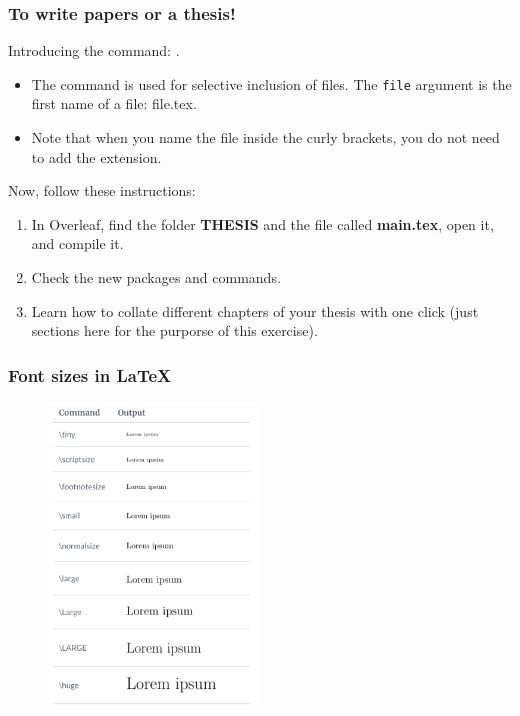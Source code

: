 \begin{frame}[fragile]
\frametitle{To write papers or a thesis!}
Introducing the command: \color{blue}{\verb||}\color{black}{}. \\
\begin{itemize}
\item The \color{blue}{\verb||}\color{black}{} command is used for selective inclusion of files. The \verb|file| argument is the first name of a file: file.tex.\\
\item Note that when you name the file inside the curly brackets, you do not need to add the extension. \\
\end{itemize}
\pause
Now, follow these instructions:
\begin{enumerate}
\item In Overleaf, find the folder \textbf{THESIS} and the file called \textbf{main.tex}, open it, and compile it. \\
\item Check the new packages and commands. \\
\item Learn how to collate different chapters of your thesis with one click (just sections here for the purporse of this exercise). \\
\end{enumerate}
\end{frame}


\begin{frame}[fragile]
\frametitle{Font sizes in \LaTeX}
\begin{figure}
\includegraphics[width=56mm]{figures/Fonts.png}
\end{figure}
\end{frame}


